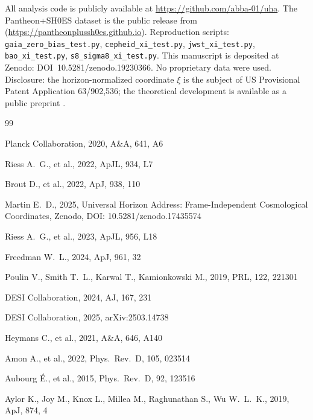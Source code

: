 \documentclass[usenatbib]{mnras}
\begin{document}
All analysis code is publicly available at \url{https://github.com/abba-01/uha}.
The Pantheon+SH0ES dataset is the public release from \citet{brout2022}
(\url{https://pantheonplussh0es.github.io}). Reproduction scripts:
\texttt{gaia\_zero\_bias\_test.py}, \texttt{cepheid\_xi\_test.py},
\texttt{jwst\_xi\_test.py}, \texttt{bao\_xi\_test.py},
\texttt{s8\_sigma8\_xi\_test.py}. This manuscript is deposited at Zenodo:
DOI~10.5281/zenodo.19230366. No proprietary data were used.
Disclosure: the horizon-normalized coordinate $\xi$ is the subject of
US Provisional Patent Application 63/902,536; the theoretical development
is available as a public preprint \citep{martin2025}.


\begin{thebibliography}{99}

Planck Collaboration, 2020, A\&A, 641, A6

Riess A.~G., et al., 2022, ApJL, 934, L7

Brout D., et al., 2022, ApJ, 938, 110

Martin E.~D., 2025, Universal Horizon Address: Frame-Independent
Cosmological Coordinates, Zenodo, DOI: 10.5281/zenodo.17435574

Riess A.~G., et al., 2023, ApJL, 956, L18

Freedman W.~L., 2024, ApJ, 961, 32

Poulin V., Smith T.~L., Karwal T., Kamionkowski M., 2019,
PRL, 122, 221301

DESI Collaboration, 2024, AJ, 167, 231

DESI Collaboration, 2025, arXiv:2503.14738

Heymans C., et al., 2021, A\&A, 646, A140

Amon A., et al., 2022, Phys.\ Rev.\ D, 105, 023514

Aubourg \'E., et al., 2015, Phys.\ Rev.\ D, 92, 123516

Aylor K., Joy M., Knox L., Millea M., Raghunathan S., Wu W.\ L.\ K., 2019, ApJ, 874, 4

\end{thebibliography}
\end{document}
